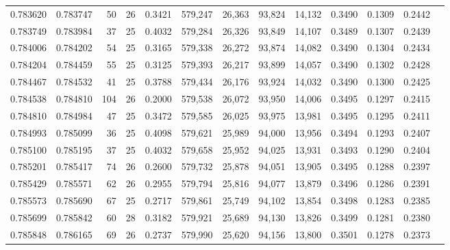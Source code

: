 \begin{tabular}{rrrrrrrrrrrrr}
0.783620 & 0.783747 &    50 &  26 &                                     0.3421 & 579,247 &  26,363 &  93,824 &  14,132 & 0.3490 & 0.1309 & 0.2442 \\
0.783749 & 0.783984 &    37 &  25 &                                     0.4032 & 579,284 &  26,326 &  93,849 &  14,107 & 0.3489 & 0.1307 & 0.2439 \\
0.784006 & 0.784202 &    54 &  25 &                                     0.3165 & 579,338 &  26,272 &  93,874 &  14,082 & 0.3490 & 0.1304 & 0.2434 \\
0.784204 & 0.784459 &    55 &  25 &                                     0.3125 & 579,393 &  26,217 &  93,899 &  14,057 & 0.3490 & 0.1302 & 0.2428 \\
0.784467 & 0.784532 &    41 &  25 &                                     0.3788 & 579,434 &  26,176 &  93,924 &  14,032 & 0.3490 & 0.1300 & 0.2425 \\
0.784538 & 0.784810 &   104 &  26 &                                     0.2000 & 579,538 &  26,072 &  93,950 &  14,006 & 0.3495 & 0.1297 & 0.2415 \\
0.784810 & 0.784984 &    47 &  25 &                                     0.3472 & 579,585 &  26,025 &  93,975 &  13,981 & 0.3495 & 0.1295 & 0.2411 \\
0.784993 & 0.785099 &    36 &  25 &                                     0.4098 & 579,621 &  25,989 &  94,000 &  13,956 & 0.3494 & 0.1293 & 0.2407 \\
0.785100 & 0.785195 &    37 &  25 &                                     0.4032 & 579,658 &  25,952 &  94,025 &  13,931 & 0.3493 & 0.1290 & 0.2404 \\
0.785201 & 0.785417 &    74 &  26 &                                     0.2600 & 579,732 &  25,878 &  94,051 &  13,905 & 0.3495 & 0.1288 & 0.2397 \\
0.785429 & 0.785571 &    62 &  26 &                                     0.2955 & 579,794 &  25,816 &  94,077 &  13,879 & 0.3496 & 0.1286 & 0.2391 \\
0.785573 & 0.785690 &    67 &  25 &                                     0.2717 & 579,861 &  25,749 &  94,102 &  13,854 & 0.3498 & 0.1283 & 0.2385 \\
0.785699 & 0.785842 &    60 &  28 &                                     0.3182 & 579,921 &  25,689 &  94,130 &  13,826 & 0.3499 & 0.1281 & 0.2380 \\
0.785848 & 0.786165 &    69 &  26 &                                     0.2737 & 579,990 &  25,620 &  94,156 &  13,800 & 0.3501 & 0.1278 & 0.2373 \\

\end{tabular}
